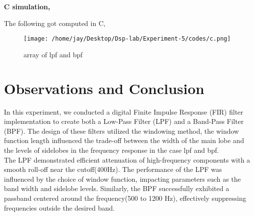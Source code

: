 \documentclass[journal,12pt,onecolumn]{IEEEtran}
\theoremstyle{remark}
\begin{document}
\clearpage
\textbf{C simulation,}

The following got computed in  C,\\
\begin{figure}[ht] %
  \centering
  \texttt{[image: /home/jay/Desktop/Dsp-lab/Experiment-5/codes/c.png]}
  \label{fig:your_label}
  \caption{array of lpf and bpf}
\end{figure}
\section{Observations and Conclusion}
In this experiment, we conducted a digital Finite Impulse Response (FIR) filter implementation to create both a Low-Pass Filter (LPF) and a Band-Pass Filter (BPF). The design of these filters utilized the windowing method, the window function length influenced the trade-off between the width of the main lobe and the levels of sidelobes in the frequency response in the case lpf and bpf.  \\
The LPF demonstrated efficient attenuation of high-frequency components with a smooth roll-off near the cutoff(400Hz). The performance of the LPF was influenced by the choice of window function, impacting parameters such as the band width and sidelobe levels. Similarly, the BPF successfully exhibited a passband centered around the frequency(500 to 1200 Hz), effectively suppressing frequencies outside the desired band. 
\end{document}

